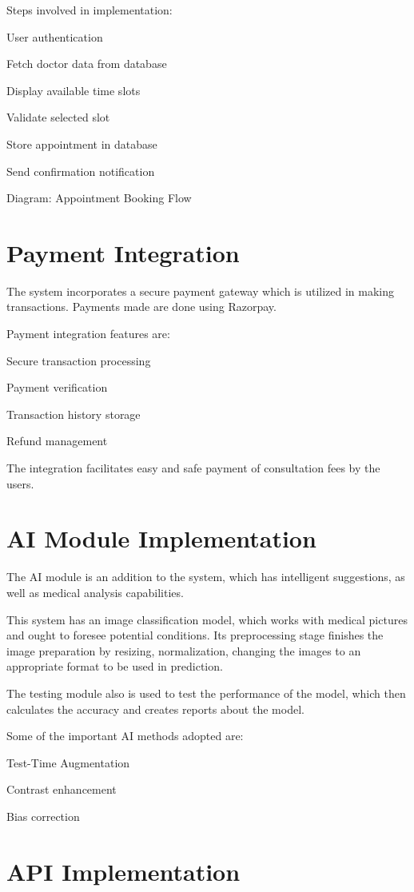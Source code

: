 Steps involved in implementation:

User authentication

Fetch doctor data from database

Display available time slots

Validate selected slot

Store appointment in database

Send confirmation notification

Diagram: Appointment Booking Flow

\section{Payment Integration}

The system incorporates a secure payment gateway which is utilized in making transactions. Payments made are done using Razorpay.

Payment integration features are:

Secure transaction processing

Payment verification

Transaction history storage

Refund management

The integration facilitates easy and safe payment of consultation fees by the users.

\section{AI Module Implementation}

The AI module is an addition to the system, which has intelligent suggestions, as well as medical analysis capabilities.

This system has an image classification model, which works with medical pictures and ought to foresee potential conditions. Its preprocessing stage finishes the image preparation by resizing, normalization, changing the images to an appropriate format to be used in prediction.

The testing module also is used to test the performance of the model, which then calculates the accuracy and creates reports about the model.

Some of the important AI methods adopted are:

Test-Time Augmentation

Contrast enhancement

Bias correction

\section{API Implementation}


